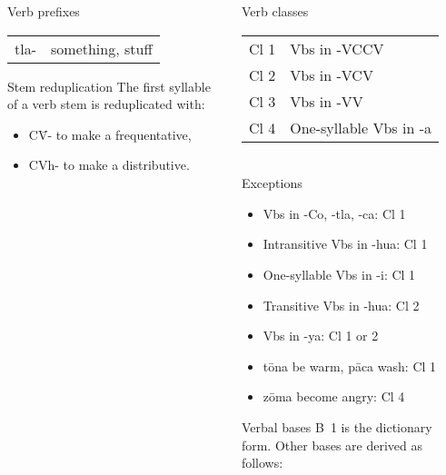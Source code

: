 \documentclass[12pt]{beamer}
\newcommand{\nah}[1]{\textcolor{nahgrn}{#1}}
\newcommand{\trs}[1]{\textcolor{nahblu}{#1}}
\begin{document}
\begin{frame}
\begin{columns}[t]
\begin{column}{0.18\linewidth}
\begin{block}{Verb prefixes}
\begin{tabular}[t]{ll}
          \nah{tla-} & \trs{something, stuff}           \\
        \end{tabular}
      \end{block}
      \begin{block}{Stem reduplication}
        The first syllable of a verb stem is reduplicated with:
        \begin{itemize}
          \item \nah{C\=V-} to make a frequentative,
          \item \nah{CVh-} to make a distributive.
        \end{itemize}
      \end{block}
      \begin{example}

      \end{example}
    \end{column}
    \begin{column}{.18\linewidth}
      \begin{block}{Verb classes}
        \begin{tabular}{ll}
          Cl 1 & Vbs in \nah{-VCCV}           \\
          Cl 2 & Vbs in \nah{-VCV}            \\
          Cl 3 & Vbs in \nah{-VV}             \\
          Cl 4 & One-syllable Vbs in \nah{-a}
        \end{tabular}\\
        Exceptions
        \begin{itemize}
          \item Vbs in \nah{-Co}, \nah{-tla}, \nah{-ca}: Cl 1
          \item Intransitive Vbs in \nah{-hua}: Cl 1
          \item One-syllable Vbs in \nah{-i}: Cl 1
          \item Transitive Vbs in \nah{-hua}: Cl 2
          \item Vbs in \nah{-ya}: Cl 1 or 2
          \item \nah{tōna} \trs{be warm}, \nah{pāca} \trs{wash}: Cl 1
          \item \nah{zōma} \trs{become angry}: Cl 4
        \end{itemize}
      \end{block}
      \begin{block}{Verbal bases}
        B~1 is the dictionary form. Other bases are derived as follows:
        \begin{tabular}{lll}

\end{tabular}
\end{block}
\end{column}
\end{columns}
\end{frame}
\end{document}

